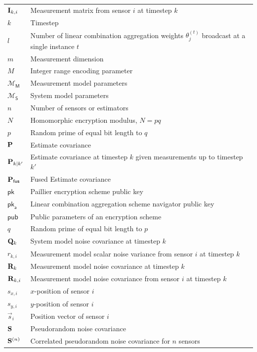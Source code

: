 \documentclass[oneside]{scrbook}
\theoremstyle{definition}
\theoremstyle{definition}
\theoremstyle{remark}
\begin{document}
\begin{longtable}{p{}p{}}
    ${{\mathbf{I}}}_{k,i}$ & Measurement matrix from sensor $i$ at timestep $k$\\
    $k$ & Timestep\\
    $l$ & Number of linear combination aggregation weights $\theta^{(t)}_j$ broadcast at a single instance $t$\\
    $m$ & Measurement dimension\\
    $M$ & Integer range encoding parameter\\
    $\mathcal{M}_{\mathsf{M}}$ & Measurement model parameters\\
    $\mathcal{M}_{\mathsf{S}}$ & System model parameters\\
    $n$ & Number of sensors or estimators\\
    $N$ & Homomorphic encryption modulus, $N=pq$\\
    $p$ & Random prime of equal bit length to $q$\\
    ${{\mathbf{P}}}$ & Estimate covariance\\
    ${{\mathbf{P}}}_{k|k'}$ & Estimate covariance at timestep $k$ given measurements up to timestep $k'$\\
    ${{\mathbf{P}}}_{\mathsf{fus}}$ & Fused Estimate covariance\\
    $\mathsf{pk}$ & Paillier encryption scheme public key\\
    $\mathsf{pk}_{\mathsf{a}}$ & Linear combination aggregation scheme navigator public key\\
    $\mathsf{pub}$ & Public parameters of an encryption scheme\\
    $q$ & Random prime of equal bit length to $p$\\
    ${{\mathbf{Q}}}_k$ & System model noise covariance at timestep $k$\\
    $r_{k,i}$ & Measurement model scalar noise variance from sensor $i$ at timestep $k$\\
    ${{\mathbf{R}}}_k$ & Measurement model noise covariance at timestep $k$\\
    ${{\mathbf{R}}}_{k,i}$ & Measurement model noise covariance from sensor $i$ at timestep $k$\\
    $s_{x,i}$ & $x$-position of sensor $i$\\
    $s_{y,i}$ & $y$-position of sensor $i$\\
    $\vec{s}_i$ & Position vector of sensor $i$\\
    ${{\mathbf{S}}}$ & Pseudorandom noise covariance\\
    ${{\mathbf{S}}}^{(n)}$ & Correlated pseudorandom noise covariance for $n$ sensors\\

\end{longtable}
\end{document}
